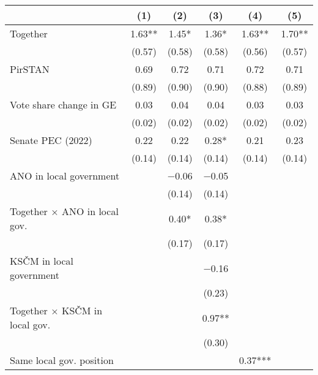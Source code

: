 \begin{tabular}[t]{lccccc}
\toprule
  & (1) & (2) & (3) & (4) & (5) \\
\midrule

Together                                & \num{1.63}**   & \num{1.45}*    & \num{1.36}*    & \num{1.63}**   & \num{1.70}**   \\
& (\num{0.57})   & (\num{0.58})   & (\num{0.58})   & (\num{0.56})   & (\num{0.57})   \\
PirSTAN                                 & \num{0.69}     & \num{0.72}     & \num{0.71}     & \num{0.72}     & \num{0.71}     \\
& (\num{0.89})   & (\num{0.90})   & (\num{0.90})   & (\num{0.88})   & (\num{0.89})   \\
Vote share change in GE                 & \num{0.03}     & \num{0.04}     & \num{0.04}     & \num{0.03}     & \num{0.03}     \\
& (\num{0.02})   & (\num{0.02})   & (\num{0.02})   & (\num{0.02})   & (\num{0.02})   \\
Senate PEC (2022)                       & \num{0.22}     & \num{0.22}     & \num{0.28}*    & \num{0.21}     & \num{0.23}    \\
& (\num{0.14})   & (\num{0.14})   & (\num{0.14})   & (\num{0.14})   & (\num{0.14})   \\
ANO in local government                 &                 & \num{-0.06}    & \num{-0.05}    &                 &                 \\
&                 & (\num{0.14})   & (\num{0.14})   &                 &                 \\
Together × ANO in local gov.            &                 & \num{0.40}*    & \num{0.38}*    &                 &                 \\
&                 & (\num{0.17})   & (\num{0.17})   &                 &                 \\
KSČM in local government                &                 &                 & \num{-0.16}    &                 &                 \\
&                 &                 & (\num{0.23})   &                 &                 \\
Together × KSČM in local gov.           &                 &                 & \num{0.97}**   &                 &                 \\
&                 &                 & (\num{0.30})   &                 &                 \\
Same local gov. position                &                 &                 &                 & \num{0.37}***  &                 \\

\end{tabular}
